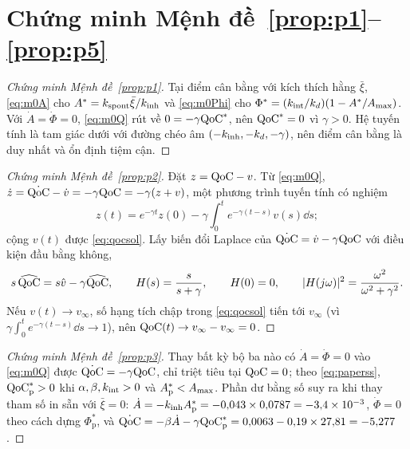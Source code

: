 \appendix
\section{Chứng minh Mệnh đề~\ref{prop:p1}--\ref{prop:p5}}
\label{app:proofs}

\begin{proof}[Chứng minh Mệnh đề~\ref{prop:p1}]
Tại điểm cân bằng với kích thích hằng $\bar\xi$, \eqref{eq:m0A} cho $A^*=k_{\mathrm{spont}}\bar\xi/k_{\mathrm{inh}}$ và \eqref{eq:m0Phi} cho $\Phi^*=(k_{\mathrm{int}}/k_{d})(1-A^*/A_{\max})$. Với $\dot A=\dot\Phi=0$, \eqref{eq:m0Q} rút về $0=-\gamma\mathrm{QoC}^*$, nên $\mathrm{QoC}^*=0$ vì $\gamma>0$. Hệ tuyến tính là tam giác dưới với đường chéo âm $(-k_{\mathrm{inh}},-k_{d},-\gamma)$, nên điểm cân bằng là duy nhất và ổn định tiệm cận.
\end{proof}

\begin{proof}[Chứng minh Mệnh đề~\ref{prop:p2}]
Đặt $z=\mathrm{QoC}-v$. Từ \eqref{eq:m0Q}, $\dot z=\dot{\mathrm{QoC}}-\dot v=-\gamma\mathrm{QoC}=-\gamma(z+v)$, một phương trình tuyến tính có nghiệm
\[
  z(t)=e^{-\gamma t}z(0)-\gamma\int_0^te^{-\gamma(t-s)}v(s)\dd s;
\]
cộng $v(t)$ được \eqref{eq:qocsol}. Lấy biến đổi Laplace của $\dot{\mathrm{QoC}}=\dot v-\gamma\mathrm{QoC}$ với điều kiện đầu bằng không,
\[
  s\,\widehat{\mathrm{QoC}}=s\hat v-\gamma\widehat{\mathrm{QoC}},\qquad H(s)=\frac{s}{s+\gamma},\qquad H(0)=0,\qquad |H(j\omega)|^2=\frac{\omega^2}{\omega^2+\gamma^2}.
\]
Nếu $v(t)\to v_\infty$, số hạng tích chập trong \eqref{eq:qocsol} tiến tới $v_\infty$ (vì $\gamma\int_0^te^{-\gamma(t-s)}\dd s\to1$), nên $\mathrm{QoC}(t)\to v_\infty-v_\infty=0$.
\end{proof}

\begin{proof}[Chứng minh Mệnh đề~\ref{prop:p3}]
Thay bất kỳ bộ ba nào có $\dot A=\dot\Phi=0$ vào \eqref{eq:m0Q} được $\dot{\mathrm{QoC}}=-\gamma\mathrm{QoC}$, chỉ triệt tiêu tại $\mathrm{QoC}=0$; theo \eqref{eq:paperss}, $\mathrm{QoC}^*_{\mathrm p}>0$ khi $\alpha,\beta,k_{\mathrm{int}}>0$ và $A^*_{\mathrm p}<A_{\max}$. Phần dư bằng số suy ra khi thay tham số in sẵn với $\bar\xi=0$: $\dot A=-k_{\mathrm{inh}} A^*_{\mathrm p}=-0{,}043\times0{,}0787=-3{,}4\times10^{-3}$, $\dot\Phi=0$ theo cách dựng $\Phi^*_{\mathrm p}$, và $\dot{\mathrm{QoC}}=-\beta\dot A-\gamma\mathrm{QoC}^*_{\mathrm p}=0{,}0063-0{,}19\times27{,}81=-5{,}277$.
\end{proof}


